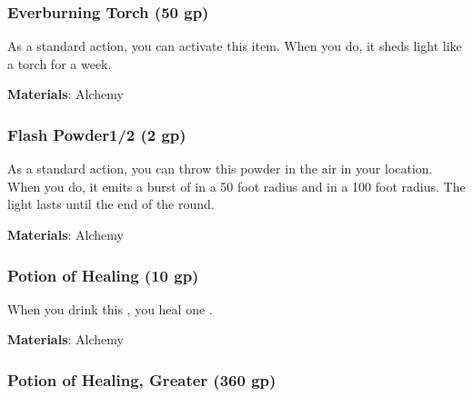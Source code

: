 \lowercase{\hypertarget{item:Everburning Torch}{}}\label{item:Everburning Torch}
\hypertarget{item:Everburning Torch}{\subsubsection{Everburning Torch\hfill{} (50 gp)}}

As a standard action, you can activate this item.
When you do, it sheds light like a torch for a week.



\vspace{0.25em}
\textbf{Materials}: Alchemy


\lowercase{\hypertarget{item:Flash Powder}{}}\label{item:Flash Powder}
\hypertarget{item:Flash Powder}{\subsubsection{Flash Powder\hfill1/2 (2 gp)}}

As a standard action, you can throw this powder in the air in your location.
When you do, it emits a burst of  in a 50 foot radius and  in a 100 foot radius.
The light lasts until the end of the round.



\vspace{0.25em}
\textbf{Materials}: Alchemy


\lowercase{\hypertarget{item:Potion of Healing}{}}\label{item:Potion of Healing}
\hypertarget{item:Potion of Healing}{\subsubsection{Potion of Healing\hfill{} (10 gp)}}

When you drink this , you heal one .



\vspace{0.25em}
\textbf{Materials}: Alchemy


\lowercase{\hypertarget{item:Potion of Healing, Greater}{}}\label{item:Potion of Healing, Greater}
\hypertarget{item:Potion of Healing, Greater}{\subsubsection{Potion of Healing, Greater\hfill{} (360 gp)}}

